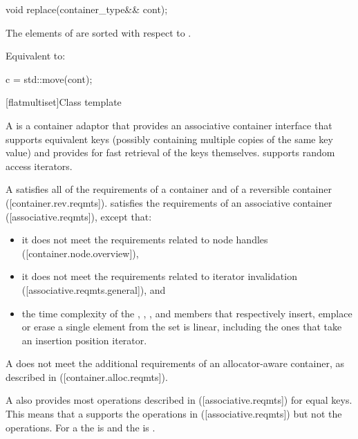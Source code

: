 \begin{addedblock}
%
\begin{itemdecl}
void replace(container_type&& cont);
\end{itemdecl}

\begin{itemdescr}
\pnum \expects
The elements of  are sorted with respect to .

\pnum
\effects Equivalent to:
\begin{codeblock}
c = std::move(cont);
\end{codeblock}
\end{itemdescr}

[flatmultiset]{Class template }

\pnum
{}%
A  is a container adaptor that provides an associative
container interface that supports equivalent keys (possibly containing
multiple copies of the same key value) and provides for fast retrieval of the
keys themselves.  supports random access iterators.

\pnum
A  satisfies all of the requirements of a container and of a
reversible container ([container.rev.reqmts]).   satisfies
the requirements of an associative container ([associative.reqmts]), except
that:
\begin{itemize}
\item it does not meet the requirements related to node handles ([container.node.overview]),
\item it does not meet the requirements related to iterator invalidation ([associative.reqmts.general]), and
\item the time complexity of the , , ,
and  members that respectively insert, emplace or erase a single
element from the set is linear, including the ones that take an insertion
position iterator.
\end{itemize}
A  does not meet the additional requirements of an
allocator-aware container, as described in ([container.alloc.reqmts]).

\pnum
A  also provides most operations described
in ([associative.reqmts]) for equal keys.  This means that a
 supports the  operations
in ([associative.reqmts]) but not the  operations.  For
a  the  is  and the
 is .


\end{addedblock}
